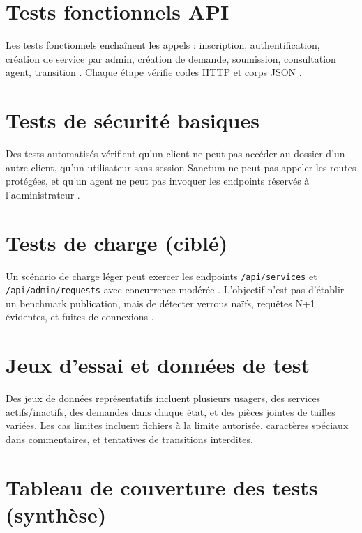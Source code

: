 \section{Tests fonctionnels API}

Les tests fonctionnels enchaînent les appels : inscription, authentification, création de service par admin, création de demande, soumission, consultation agent, transition \cite{rfc7231}. Chaque étape vérifie codes HTTP et corps JSON \cite{ieee1012}.

\section{Tests de sécurité basiques}

Des tests automatisés vérifient qu'un client ne peut pas accéder au dossier d'un autre client, qu'un utilisateur sans session Sanctum ne peut pas appeler les routes protégées, et qu'un agent ne peut pas invoquer les endpoints réservés à l'administrateur \cite{owasp2021,sanctumdoc}.

\section{Tests de charge (ciblé)}

Un scénario de charge léger peut exercer les endpoints \texttt{/api/services} et \texttt{/api/admin/requests} avec concurrence modérée \cite{kleppmann2017}. L'objectif n'est pas d'établir un benchmark publication, mais de détecter verrous naïfs, requêtes N+1 évidentes, et fuites de connexions \cite{postgresdoc}.

\section{Jeux d'essai et données de test}

Des jeux de données représentatifs incluent plusieurs usagers, des services actifs/inactifs, des demandes dans chaque état, et des pièces jointes de tailles variées. Les cas limites incluent fichiers à la limite autorisée, caractères spéciaux dans commentaires, et tentatives de transitions interdites.

\section{Tableau de couverture des tests (synthèse)}

